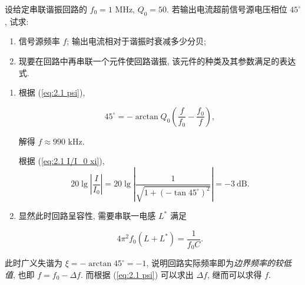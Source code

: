 \begin{exampleprob}
    设给定串联谐振回路的 $f_0=1$ MHz, $Q_0=50$. 若输出电流超前信号源电压相位 $45^\circ$, 试求:

    \begin{enumerate}
        \item 信号源频率 $f$; 输出电流相对于谐振时衰减多少分贝;
        \item 现要在回路中再串联一个元件使回路谐振, 该元件的种类及其参数满足的表达式.
    \end{enumerate}

    \begin{solution}[1]
        \begin{enumerate}
            \item 根据 (\ref{eq:2.1 psi}),

                  \begin{equation*}
                      45^\circ=-\arctan Q_0\left(\frac{f}{f_0}-\frac{f_0}{f}\right),
                  \end{equation*}

                  解得 $f\approx 990$ kHz.

                  根据 (\ref{eq:2.1 I/I_0 xi}),
                  \question[电流衰减]
                  \begin{equation*}
                      20\lg\left|\frac{I}{I_0}\right|=20\lg\left|\frac{1}{\sqrt{1+(-\tan 45^\circ)^2}}\right|=-3\ \mathrm{dB}.
                  \end{equation*}
            \item 显然此时回路呈容性, 需要串联一电感 $L^*$ 满足

                  \begin{equation*}
                      4\pi^2 f_0(L+L^*)=\frac{1}{f_0 C}.
                  \end{equation*}
        \end{enumerate}
    \end{solution}

    \begin{solution}[2]
        此时广义失谐为 $\xi=-\arctan 45^\circ=-1$, 说明回路实际频率即为\textit{边界频率的较低值}, 也即 $f=f_0-\Delta f$. 而根据 (\ref{eq:2.1 psi}) 可以求出 $\Delta f$, 继而可以求得 $f$.
    \end{solution}
\end{exampleprob}

